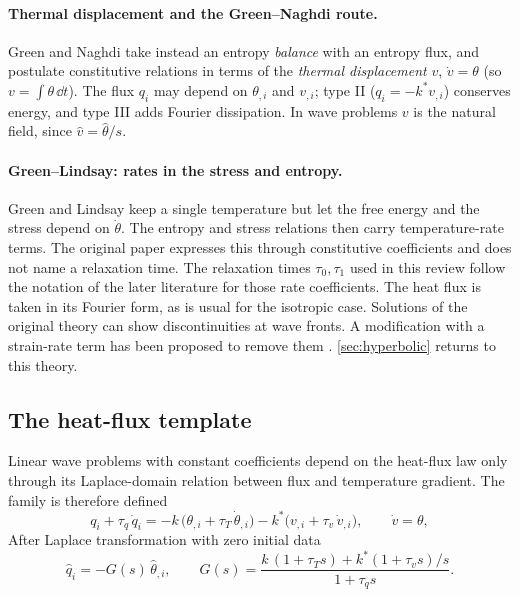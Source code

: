 \paragraph{Thermal displacement and the Green--Naghdi route.} Green and Naghdi \citep{Green1991,Green1993} take instead an entropy \emph{balance} with an entropy flux, and postulate constitutive relations in terms of the \emph{thermal displacement} $v$, $\dot v=\theta$ (so $v=\int\theta\,\dd t$). The flux $q_i$ may depend on $\theta_{,i}$ and $v_{,i}$; type II ($q_i=-k^*v_{,i}$) conserves energy, and type III adds Fourier dissipation. In wave problems $v$ is the natural field, since $\hat v=\hat\theta/s$.

\paragraph{Green--Lindsay: rates in the stress and entropy.} Green and Lindsay \citep{Green1972} keep a single temperature but let the free energy and the stress depend on $\dot\theta$. The entropy and stress relations then carry temperature-rate terms. The original paper expresses this through constitutive coefficients and does not name a relaxation time. The relaxation times $\tau_0,\tau_1$ used in this review follow the notation of the later literature for those rate coefficients. The heat flux is taken in its Fourier form, as is usual for the isotropic case. Solutions of the original theory can show discontinuities at wave fronts. A modification with a strain-rate term has been proposed to remove them \citep{Yu2018ModifiedGL}. \cref{sec:hyperbolic} returns to this theory.

\subsection{The heat-flux template}\label{sec:framework-link}
Linear wave problems with constant coefficients depend on the heat-flux law only through its Laplace-domain relation between flux and temperature gradient. The family is therefore defined
\begin{equation}
q_i+\tau_q\,\dot q_i=-k\,\bigl(\theta_{,i}+\tau_T\,\dot\theta_{,i}\bigr)-k^{*}\bigl(v_{,i}+\tau_v\,\dot v_{,i}\bigr),\qquad \dot v=\theta,\label{eq:template}
\end{equation}
After Laplace transformation with zero initial data
\begin{equation}
\hat q_i=-G(s)\,\hat\theta_{,i},\qquad
G(s)=\frac{k\,(1+\tau_Ts)+k^{*}(1+\tau_vs)/s}{1+\tau_qs}.\label{eq:G}
\end{equation}

